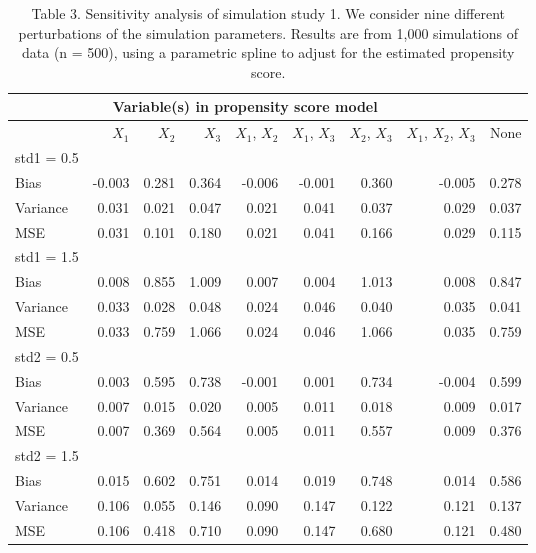 \documentclass[10,a4paperpaper,]{article}
\begin{document}
\begin{table}
\caption{Table 3. Sensitivity analysis of simulation study 1. We consider nine different perturbations of the simulation parameters. Results are from 1,000 simulations of
data (n = 500), using a parametric spline to adjust for the estimated propensity score.}
\begin{tabular}{l r r r r r r r r}
\hline
\multicolumn{8}{c}{Variable(s) in propensity score model}\\
\hline
  & $X_{1}$ & $X_{2}$ & $X_{3}$ & $X_{1}$, $X_{2}$ & $X_{1}$, $X_{3}$ & $X_{2}$, $X_{3}$ & $X_{1}$, $X_{2}$, $X_{3}$ & None\\
\hline
std1 = 0.5\\
Bias & -0.003 & 0.281 & 0.364 & -0.006 & -0.001 & 0.360 & -0.005 & 0.278\\

Variance & 0.031 & 0.021 & 0.047 & 0.021 & 0.041 & 0.037 & 0.029 & 0.037\\

MSE & 0.031 & 0.101 & 0.180 & 0.021 & 0.041 & 0.166 & 0.029 & 0.115\\

std1 = 1.5\\
Bias & 0.008 & 0.855 & 1.009 & 0.007 & 0.004 & 1.013 & 0.008 & 0.847\\

Variance & 0.033 & 0.028 & 0.048 & 0.024 & 0.046 & 0.040 & 0.035 & 0.041\\

MSE & 0.033 & 0.759 & 1.066 & 0.024 & 0.046 & 1.066 & 0.035 & 0.759\\

std2 = 0.5\\
Bias & 0.003 & 0.595 & 0.738 & -0.001 & 0.001 & 0.734 & -0.004 & 0.599\\

Variance & 0.007 & 0.015 & 0.020 & 0.005 & 0.011 & 0.018 & 0.009 & 0.017\\

MSE & 0.007 & 0.369 & 0.564 & 0.005 & 0.011 & 0.557 & 0.009 & 0.376\\

std2 = 1.5\\
Bias & 0.015 & 0.602 & 0.751 & 0.014 & 0.019 & 0.748 & 0.014 & 0.586\\

Variance & 0.106 & 0.055 & 0.146 & 0.090 & 0.147 & 0.122 & 0.121 & 0.137\\

MSE & 0.106 & 0.418 & 0.710 & 0.090 & 0.147 & 0.680 & 0.121 & 0.480\\


\end{tabular}
\end{table}
\end{document}

